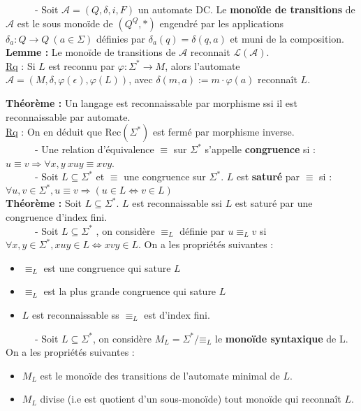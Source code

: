 \documentclass[11pt,a4paper]{article}
\begin{document}
\ \ \ \ \ \ - Soit $\mathcal{A} = (Q,\delta, i, F)$ un automate DC. Le \textbf{monoïde de transitions} de $\mathcal{A}$ est le sous monoïde de $(Q^Q,*)$ engendré par les applications $\delta_a : Q \to Q \ (a \in \Sigma) $ définies par $\delta_a(q)=\delta(q,a)$ et muni de la composition. \\

\textbf{Lemme :} Le monoïde de transitions de $\mathcal{A}$ reconnait $\mathcal{L}(\mathcal{A})$. \\

\underline{Rq} : Si $L$ est reconnu par $\varphi : \Sigma^* \to M$, alors l'automate $\mathcal{A}=(M,\delta,\varphi(\epsilon),\varphi(L))$, avec $\delta(m,a) := m \cdot \varphi(a)$ reconnaît $L$.

\textbf{Théorème :} Un langage est reconnaissable par morphisme ssi il est reconnaissable par automate. \\

\underline{Rq} : On en déduit que Rec$(\Sigma^*)$ est fermé par morphisme inverse. \\

\ \ \ \ \ \ - Une relation d'équivalence $\equiv$ sur $\Sigma^*$ s'appelle \textbf{congruence} si : $u \equiv v \Rightarrow \forall x,y \ xuy \equiv xvy$. \\

\ \ \ \ \ \ - Soit $L \subseteq \Sigma^*$ et $\equiv$ une congruence sur $\Sigma^*$. $L$ est \textbf{saturé} par $\equiv$ si : $\forall u,v \in \Sigma^*, u \equiv v \Rightarrow (u\in L \Leftrightarrow v \in L)$ \\

\textbf{Théorème :} Soit $L \subseteq \Sigma^*$. $L$ est reconnaissable ssi $L$ est saturé par une congruence d'index fini. \\

\ \ \ \ \ \ - Soit $L \subseteq \Sigma^*$ , on considère $\equiv_L$ définie par $u \equiv_L v$ si $\forall x,y \in\Sigma^*, xuy \in L \Leftrightarrow xvy \in L$. On a les propriétés suivantes :
\begin{itemize}
\item $\equiv_L$ est une congruence qui sature $L$
\item  $\equiv_L$ est la plus grande congruence qui sature $L$
\item $L$ est reconnaissable ss $\equiv_L$ est d'index fini. \\
\end{itemize}

\ \ \ \ \ \ - Soit $L \subseteq \Sigma^*$, on considère $M_L = \Sigma^*/\mathord\equiv_L$ le \textbf{monoïde syntaxique} de L. On a les propriétés suivantes :
\begin{itemize}
\item $M_L$ est le monoïde des transitions de l'automate minimal de $L$.
\item $M_L$ divise (i.e est quotient d'un sous-monoïde) tout monoïde qui reconnaît $L$.
\end{itemize}
\end{document}
